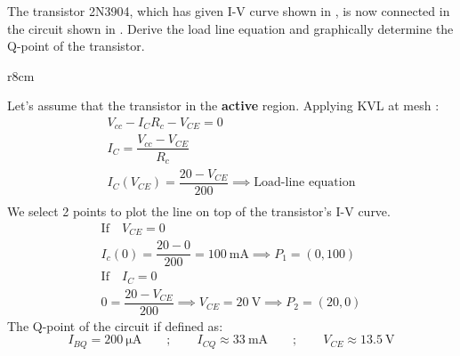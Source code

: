 \documentclass[10pt,a4paper]{memoir}
\begin{document}
\newpage
\begin{question}
  The transistor 2N3904, which has given I-V curve shown in , is now connected in the circuit shown in . Derive the load line equation and graphically determine the Q-point of the transistor.
  \begin{figure}[!h]
    \centering
     \qquad\qquad
    \subfloat[]{\texttt{[image: t10-2b]}\label{fig:t10-2b}}
    \caption{}
  \end{figure}
\end{question}
\begin{solution}
  \setlength\figwidth{80mm}
  \begin{wrapfigure}{r}{8cm}
    \centering
  \end{wrapfigure}
  Let's assume that the transistor in the \textbf{active} region.
  \newline
  Applying KVL at mesh :
  \begin{gather*}
    V_{cc} - I_{C}R_{c} - V_{CE} = 0 \\
    I_{C} = \dfrac{V_{cc} - V_{CE}}{R_{c}} \\
    I_{C}\left(V_{CE}\right) = \dfrac{20 - V_{CE}}{200}\implies \mbox{Load-line equation} \\
  \end{gather*}
  We select 2 points to plot the line on top of the transistor's I-V curve.
  \begin{gather*}
    \mbox{If}\quad V_{CE}=0 \\
    I_{c}(0) = \dfrac{20 - 0}{200} = \SI{100}{\milli\ampere} \implies P_1 = \left( 0, 100\right) \\
    \mbox{If}\quad I_{C}=0 \\
    0 = \dfrac{20 - V_{CE}}{200} \implies V_{CE} = \SI{20}{\volt} \implies P_2 = \left( 20, 0\right)
  \end{gather*}
  \newline
  The Q-point of the circuit if defined as:
  \begin{equation*}
    I_{BQ} = \SI{200}{\micro\ampere} \qquad;\qquad I_{CQ}\approx \SI{33}{\milli\ampere} \qquad;\qquad V_{CE} \approx \SI{13.5}{\volt}
  \end{equation*}
\end{solution}
\end{document}
